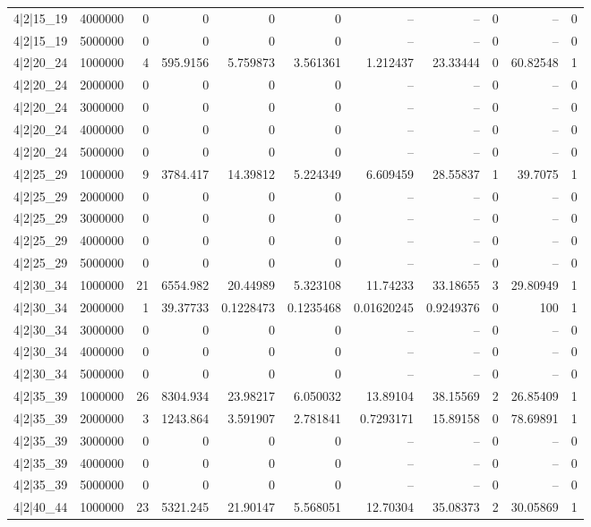 \begin{tabular}{lrrrrrrrrrr}
4|2|15\_19 & 4000000 & 0 & 0 & 0 & 0 & -- & -- & 0 & -- & 0 \\
4|2|15\_19 & 5000000 & 0 & 0 & 0 & 0 & -- & -- & 0 & -- & 0 \\
4|2|20\_24 & 1000000 & 4 & 595.9156 & 5.759873 & 3.561361 & 1.212437 & 23.33444 & 0 & 60.82548 & 1 \\
4|2|20\_24 & 2000000 & 0 & 0 & 0 & 0 & -- & -- & 0 & -- & 0 \\
4|2|20\_24 & 3000000 & 0 & 0 & 0 & 0 & -- & -- & 0 & -- & 0 \\
4|2|20\_24 & 4000000 & 0 & 0 & 0 & 0 & -- & -- & 0 & -- & 0 \\
4|2|20\_24 & 5000000 & 0 & 0 & 0 & 0 & -- & -- & 0 & -- & 0 \\
4|2|25\_29 & 1000000 & 9 & 3784.417 & 14.39812 & 5.224349 & 6.609459 & 28.55837 & 1 & 39.7075 & 1 \\
4|2|25\_29 & 2000000 & 0 & 0 & 0 & 0 & -- & -- & 0 & -- & 0 \\
4|2|25\_29 & 3000000 & 0 & 0 & 0 & 0 & -- & -- & 0 & -- & 0 \\
4|2|25\_29 & 4000000 & 0 & 0 & 0 & 0 & -- & -- & 0 & -- & 0 \\
4|2|25\_29 & 5000000 & 0 & 0 & 0 & 0 & -- & -- & 0 & -- & 0 \\
4|2|30\_34 & 1000000 & 21 & 6554.982 & 20.44989 & 5.323108 & 11.74233 & 33.18655 & 3 & 29.80949 & 1 \\
4|2|30\_34 & 2000000 & 1 & 39.37733 & 0.1228473 & 0.1235468 & 0.01620245 & 0.9249376 & 0 & 100 & 1 \\
4|2|30\_34 & 3000000 & 0 & 0 & 0 & 0 & -- & -- & 0 & -- & 0 \\
4|2|30\_34 & 4000000 & 0 & 0 & 0 & 0 & -- & -- & 0 & -- & 0 \\
4|2|30\_34 & 5000000 & 0 & 0 & 0 & 0 & -- & -- & 0 & -- & 0 \\
4|2|35\_39 & 1000000 & 26 & 8304.934 & 23.98217 & 6.050032 & 13.89104 & 38.15569 & 2 & 26.85409 & 1 \\
4|2|35\_39 & 2000000 & 3 & 1243.864 & 3.591907 & 2.781841 & 0.7293171 & 15.89158 & 0 & 78.69891 & 1 \\
4|2|35\_39 & 3000000 & 0 & 0 & 0 & 0 & -- & -- & 0 & -- & 0 \\
4|2|35\_39 & 4000000 & 0 & 0 & 0 & 0 & -- & -- & 0 & -- & 0 \\
4|2|35\_39 & 5000000 & 0 & 0 & 0 & 0 & -- & -- & 0 & -- & 0 \\
4|2|40\_44 & 1000000 & 23 & 5321.245 & 21.90147 & 5.568051 & 12.70304 & 35.08373 & 2 & 30.05869 & 1 \\

\end{tabular}

